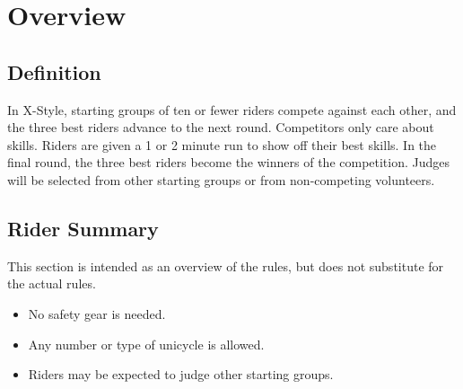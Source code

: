 \chapter{Overview}

\section{Definition}

In X-Style, starting groups of ten or fewer riders compete against each other, and the three best riders advance to the next round.
Competitors only care about skills.
Riders are given a 1 or 2 minute run to show off their best skills.
In the final round, the three best riders become the winners of the competition.
Judges will be selected from other starting groups or from non-competing volunteers.

\section{Rider Summary}

This section is intended as an overview of the rules, but does not substitute for the actual rules.
\begin{itemize}
\item No safety gear is needed.
\item Any number or type of unicycle is allowed.
\item Riders may be expected to judge other starting groups.
\end{itemize}